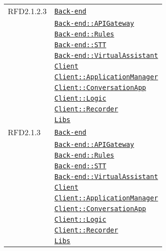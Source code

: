 \begin{longtable}{|>{\centering}m{3cm}|m{10cm}<{\centering}|}
RFD2.1.2.3 & \hyperref[Back-end]{\texttt{Back-end}}\\
& \hyperref[Back-end::APIGateway]{\texttt{Back-end::APIGateway}}\\
& \hyperref[Back-end::Rules]{\texttt{Back-end::Rules}}\\
& \hyperref[Back-end::STT]{\texttt{Back-end::STT}}\\
& \hyperref[Back-end::VirtualAssistant]{\texttt{Back-end::VirtualAssistant}}\\
& \hyperref[Client]{\texttt{Client}}\\
& \hyperref[Client::ApplicationManager]{\texttt{Client::ApplicationManager}}\\
& \hyperref[Client::ConversationApp]{\texttt{Client::ConversationApp}}\\
& \hyperref[Client::Logic]{\texttt{Client::Logic}}\\
& \hyperref[Client::Recorder]{\texttt{Client::Recorder}}\\
& \hyperref[Libs]{\texttt{Libs}}\\ \hline

RFD2.1.3 & \hyperref[Back-end]{\texttt{Back-end}}\\
& \hyperref[Back-end::APIGateway]{\texttt{Back-end::APIGateway}}\\
& \hyperref[Back-end::Rules]{\texttt{Back-end::Rules}}\\
& \hyperref[Back-end::STT]{\texttt{Back-end::STT}}\\
& \hyperref[Back-end::VirtualAssistant]{\texttt{Back-end::VirtualAssistant}}\\
& \hyperref[Client]{\texttt{Client}}\\
& \hyperref[Client::ApplicationManager]{\texttt{Client::ApplicationManager}}\\
& \hyperref[Client::ConversationApp]{\texttt{Client::ConversationApp}}\\
& \hyperref[Client::Logic]{\texttt{Client::Logic}}\\
& \hyperref[Client::Recorder]{\texttt{Client::Recorder}}\\
& \hyperref[Libs]{\texttt{Libs}}\\ \hline


\end{longtable}
